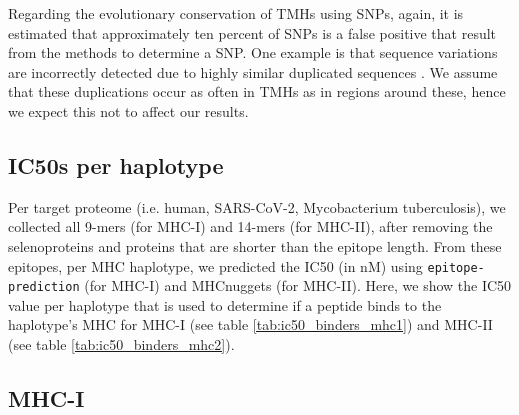 
Regarding the evolutionary conservation of TMHs using SNPs,
again, it is estimated that approximately ten percent
of SNPs is a false positive that result from the methods to determine
a SNP. One example is that sequence variations are incorrectly
detected due to highly similar duplicated sequences \cite{musumeci2010single}.
We assume that these duplications occur as often in TMHs as in
regions around these, hence we expect this not to affect our results.

\subsection{IC50s per haplotype}
\label{subsec:ic50s_per_haplotype}

Per target proteome (i.e. human, SARS-CoV-2, Mycobacterium tuberculosis),
we collected all 9-mers (for MHC-I) and 14-mers (for MHC-II),
after removing the selenoproteins and proteins that are shorter
than the epitope length.
From these epitopes, per MHC haplotype,
we predicted the IC50 (in nM) using \verb;epitope-prediction; (for MHC-I)
and MHCnuggets (for MHC-II). 
Here, we show the IC50 value per haplotype that
is used to determine if a peptide binds to the haplotype's MHC
for MHC-I (see table \ref{tab:ic50_binders_mhc1}) and 
MHC-II (see table \ref{tab:ic50_binders_mhc2}).





\subsection{MHC-I}

